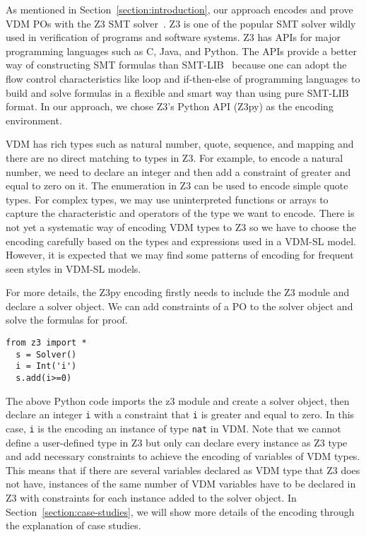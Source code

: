 
As mentioned in Section~\ref{section:introduction}, our approach encodes and prove VDM POs with the Z3 SMT solver~\cite{MB:08:ZSS}. Z3 is one of the popular SMT solver wildly used in verification of programs and software systems. Z3 has APIs for major programming languages such as C, Java, and Python. The APIs provide a better way of constructing SMT formulas than SMT-LIB~\cite{BarFT-SMTLIB} because one can adopt the flow control characteristics like loop and if-then-else of programming languages to build and solve formulas in a flexible and smart way than using pure SMT-LIB format. In our approach, we chose Z3's Python API (Z3py) as the encoding environment. 

VDM has rich types such as natural number, quote, sequence, and mapping and there are no direct matching to types in Z3. For example, to encode a natural number, we need to declare an integer and then add a constraint of greater and equal to zero on it. The enumeration in Z3 can be used to encode simple quote types. For complex types, we may use uninterpreted functions or arrays to capture the characteristic and operators of the type we want to encode. There is not yet a systematic way of encoding VDM types to Z3 so we have to choose the encoding carefully based on the types and expressions used in a VDM-SL model. However, it is expected that we may find some patterns of encoding for frequent seen styles in VDM-SL models.

For more details, the Z3py encoding firstly needs to include the Z3 module and declare a solver object. We can add constraints of a PO to the solver object and solve the formulas for proof.

\begin{mdframed}[roundcorner=5pt,shadow=true]
\begin{Verbatim}[fontsize=\small]
  from z3 import *
  s = Solver()
  i = Int('i')
  s.add(i>=0)
\end{Verbatim}
\end{mdframed}

The above Python code imports the z3 module and create a solver object, then declare an integer {\tt i} with a constraint that {\tt i} is greater and equal to zero. In this case, {\tt i} is the encoding an instance of type {\tt nat} in VDM. Note that we cannot define a user-defined type in Z3 but only can declare every instance as Z3 type and add necessary constraints to achieve the encoding of variables of VDM types. This means that if there are several variables declared as VDM type that Z3 does not have, instances of the same number of VDM variables have to be declared in Z3 with constraints for each instance added to the solver object. In Section~\ref{section:case-studies}, we will show more details of the encoding through the explanation of case studies.

